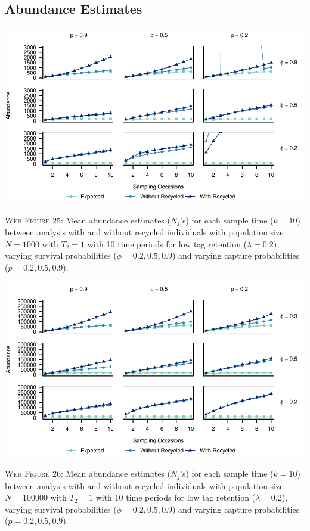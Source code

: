 \documentclass[]{article}
\begin{document}
\newpage

\subsection{Abundance Estimates}\label{abundance-estimates}

\includegraphics{Appendix_files/figure-latex/25_abundance_L_GJSTL1-1.pdf}

\textsc{Web Figure 25:} Mean abundance estimates (\(N_j\)'s) for each
sample time (\(k=10\)) between analysis with and without recycled
individuals with population size \(N=1000\) with \(T_2=1\) with 10 time
periods for low tag retention (\(\lambda=0.2\)), varying survival
probabilities (\(\phi=0.2,0.5,0.9\)) and varying capture probabilities
(\(p=0.2,0.5,0.9\)).

\includegraphics{Appendix_files/figure-latex/26_abundance_L_GJSTL2-1.pdf}

\textsc{Web Figure 26:} Mean abundance estimates (\(N_j\)'s) for each
sample time (\(k=10\)) between analysis with and without recycled
individuals with population size \(N=100000\) with \(T_2=1\) with 10
time periods for low tag retention (\(\lambda=0.2\)), varying survival
probabilities (\(\phi=0.2,0.5,0.9\)) and varying capture probabilities
(\(p=0.2,0.5,0.9\)).
\end{document}
